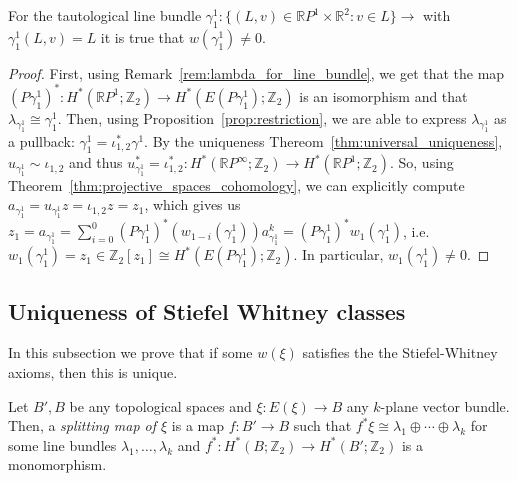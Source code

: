 \begin{proposition} For the tautological line bundle $\gamma_1^1:\big\{(L,v)\in\mathbb{R}P^1\times\mathbb{R}^2:v\in L\big\}\to$ with $\gamma_1^1(L,v)=L$ it is true that $w(\gamma_1^1)\neq0$.
\end{proposition}
\begin{proof} First, using Remark~\ref{rem:lambda_for_line_bundle}, we get that the map $(P\gamma_1^1)^*:H^*(\mathbb{R}P^1;\mathbb{Z}_2)\to H^*(E(P\gamma_1^1);\mathbb{Z}_2)$ is an isomorphism and that $\lambda_{\gamma_1^1}\cong\gamma_1^1$. Then, using Proposition~\ref{prop:restriction}, we are able to express $\lambda_{\gamma_1^1}$ as a pullback: $\gamma_1^1=\iota_{1,2}^*\gamma^1$. By the uniqueness Thereom~\ref{thm:universal_uniqueness}, $u_{\gamma_1^1}\sim\iota_{1,2}$ and thus $u_{\gamma_1^1}^*=\iota_{1,2}^*:H^*(\mathbb{R}P^{\infty};\mathbb{Z}_2)\to H^*(\mathbb{R}P^1;\mathbb{Z}_2)$. So, using Theorem~\ref{thm:projective_spaces_cohomology}, we can explicitly compute $a_{\gamma_1^1}=u_{\gamma_1^1}z=\iota_{1,2}z=z_1$, which gives us $z_1=a_{\gamma_1^1}=\sum_{i=0}^0(P\gamma_1^1)^*(w_{1-i}(\gamma_1^1))a_{\gamma_1^1}^k=(P\gamma_1^1)^*w_1(\gamma_1^1)$, i.e. $w_1(\gamma_1^1)=z_1\in\mathbb{Z}_2[z_1]\cong H^*(E(P\gamma_1^1);\mathbb{Z}_2)$. In particular, $w_1(\gamma_1^1)\neq0$.
\end{proof}

\subsection{Uniqueness of Stiefel Whitney classes}
In this subsection we prove that if some $w(\xi)$ satisfies the the Stiefel-Whitney axioms, then this is unique.

\begin{definition} Let $B',B$ be any topological spaces and $\xi:E(\xi)\to B$ any $k$-plane vector bundle. Then, a \emph{splitting map of $\xi$} is a map $f:B'\to B$ such that $f^*\xi\cong\lambda_1\oplus\cdots\oplus\lambda_k$ for some line bundles $\lambda_1,\ldots,\lambda_k$ and $f^*:H^*(B;\mathbb{Z}_2)\to H^*(B';\mathbb{Z}_2)$ is a monomorphism.
\end{definition}

